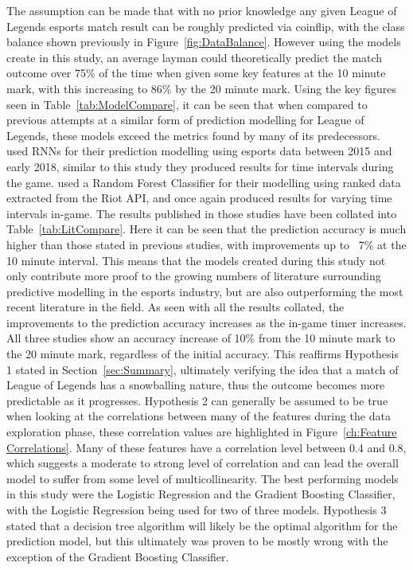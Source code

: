 The assumption can be made that with no prior knowledge any given League of Legends esports match result can be roughly predicted via coinflip, with the class balance shown previously in Figure~\ref{fig:DataBalance}.
However using the models create in this study, an average layman could theoretically predict the match outcome over 75\% of the time when given some key features at the 10 minute mark, with this increasing to 86\% by the 20 minute mark.
Using the key figures seen in Table~\ref{tab:ModelCompare}, it can be seen that when compared to previous attempts at a similar form of prediction modelling for League of Legends, these models exceed the metrics found by many of its predecessors. \\

\citet{silva2018continuous} used \ac{RNN}s for their prediction modelling using esports data between 2015 and early 2018, similar to this study they produced results for time intervals during the game.
\citet{lee2020predicting} used a Random Forest Classifier for their modelling using ranked data extracted from the Riot API, and once again produced results for varying time intervals in-game.
The results published in those studies have been collated into Table~\ref{tab:LitCompare}.
Here it can be seen that the prediction accuracy is much higher than those stated in previous studies, with improvements up to ~7\% at the 10 minute interval.
This means that the models created during this study not only contribute more proof to the growing numbers of literature surrounding predictive modelling in the esports industry, but are also outperforming the most recent literature in the field.
As seen with all the results collated, the improvements to the prediction accuracy increases as the in-game timer increases.
All three studies show an accuracy increase of 10\% from the 10 minute mark to the 20 minute mark, regardless of the initial accuracy.
This reaffirms Hypothesis 1 stated in Section~\ref{sec:Summary}, ultimately verifying the idea that a match of League of Legends has a snowballing nature, thus the outcome becomes more predictable as it progresses.
Hypothesis 2 can generally be assumed to be true when looking at the correlations between many of the features during the data exploration phase, these correlation values are highlighted in Figure~\ref{ch:Feature Correlations}.
Many of these features have a correlation level between 0.4 and 0.8, which suggests a moderate to strong level of correlation and can lead the overall model to suffer from some level of multicollinearity.
The best performing models in this study were the Logistic Regression and the Gradient Boosting Classifier, with the Logistic Regression being used for two of three models.
Hypothesis 3 stated that a decision tree algorithm will likely be the optimal algorithm for the prediction model, but this ultimately was proven to be mostly wrong with the exception of the Gradient Boosting Classifier.

